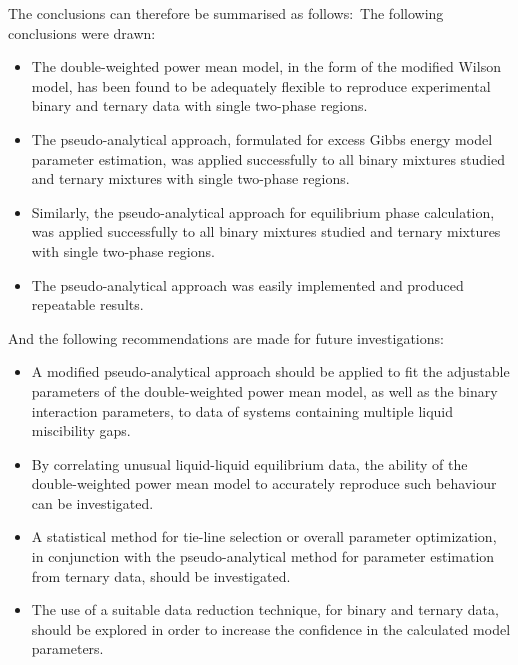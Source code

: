 The conclusions can therefore be summarised as follows:\
The following conclusions were drawn:\
\begin{itemize}
\item The double-weighted power mean model, in the form of the modified Wilson model, has been found to be adequately flexible to reproduce experimental binary and ternary data with single two-phase regions.\
\item The pseudo-analytical approach, formulated for excess Gibbs energy model parameter estimation, was applied successfully to all binary mixtures studied and ternary mixtures with single two-phase regions.\
\item Similarly, the pseudo-analytical approach for equilibrium phase calculation, was applied successfully to all binary mixtures studied and ternary mixtures with single two-phase regions.\
\item The pseudo-analytical approach was easily implemented and produced repeatable results.\
\end{itemize}

And the following recommendations are made for future investigations:\
\begin{itemize}
\item A modified pseudo-analytical approach should be applied to fit the adjustable parameters of the double-weighted power mean model, as well as the binary interaction parameters, to data of systems containing multiple liquid miscibility gaps.\
\item By correlating unusual liquid-liquid equilibrium data, the ability of the double-weighted power mean model to accurately reproduce such behaviour can be investigated.\
\item A statistical method for tie-line selection or overall parameter optimization, in conjunction with the pseudo-analytical method for parameter estimation from ternary data, should be investigated.\
\item The use of a suitable data reduction technique, for binary and ternary data, should be explored in order to increase the confidence in the calculated model parameters.
\end{itemize}
